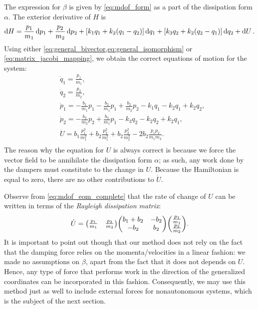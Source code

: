  The expression for \(\beta\) is given by \cref{eq:mdof_form} as a part of the dissipation form \(\alpha\). The exterior derivative of \(H\) is 
     \begin{equation}
     \dd{H} = \frac{p_1}{m_1}\dd{p_1} + \frac{p_2}{m_2}\dd{p_2} +  \qty[k_1q_1 + k_2(q_1 - q_2)]\dd{q_1} + \qty[k_3q_2 + k_2(q_2 - q_1)]\dd{q_2} + \dd{U}.
\end{equation}
 Using either \cref{eq:general_bivector,eq:general_isomorphism} or \cref{eq:matrix_jacobi_mapping}, we obtain the correct equations of motion for the system:
 \begin{equation}
     \begin{split}
         &\dot{q}_1 = \frac{p_1}{m_1}, \\
         &\dot{q}_2 = \frac{p_2}{m_2}, \\
         &\dot{p}_1 = -\frac{b_1}{m_1}p_1 - \frac{b_2}{m_1}p_1 + \frac{b_2}{m_2}p_2 - k_1 q_1 - k_2 q_1 + k_2 q_2, \\
         &\dot{p}_2 =  - \frac{b_2}{m_2}p_2 + \frac{b_2}{m_1}p_1 - k_3 q_2 - k_2 q_2 + k_2 q_1, \\
         &\dot{U} = b_1\frac{p_1^2}{m_1^2} + b_2\frac{p_2^2}{m_1^2} +  b_2\frac{p_2^2}{m_2^2} - 2b_2 \frac{p_1 p_2}{m_1 m_2}. \\
     \end{split}
     \label{eq:mdof_eom_complete}
 \end{equation}
The reason why the equation for \(U\) is always correct is because we force the vector field to be annihilate the dissipation form \(\alpha\); as such, any work done by the dampers must constitute to the change in \(U\). Because the Hamiltonian is equal to zero, there are no other contributions to \(\dot{U}\). 

Observe from \cref{eq:mdof_eom_complete} that the rate of change of \(U\) can be written in terms of the \emph{Rayleigh dissipation matrix}:
\begin{equation}
     \dot{U} = \mqty(\tfrac{p_1}{m_1} & \tfrac{p_2}{m_2}) \mqty(b_1 + b_2 & -b_2 \\ -b_2 & b_2) \mqty(\tfrac{p_1}{m_1} \\ \tfrac{p_2}{m_2}).
\end{equation}
It is important to point out though that our method does not rely on the fact that the damping force relies on the momenta/velocities in a linear fashion: we made no assumptions on \(\beta\), apart from the fact that it does not depends on \(U\). Hence, any type of force that performs work in the direction of the generalized coordinates can be incorporated in this fashion. Consequently, we may use this method just as well to include external forces for nonautonomous systems, which is the subject of the next section.

